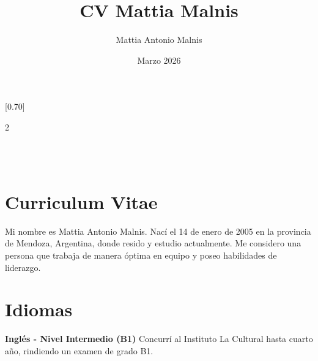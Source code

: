 \documentclass[lighthipster]{simplehipstercv}
\title{CV Mattia Malnis}
\author{Mattia Antonio Malnis}
\date{Marzo 2026}
\begin{document}
\thispagestyle{empty}


\subsection*{}
\vspace{4em} 

\setlength{\columnsep}{1cm}
[0.70]
\begin{paracol}{2}

\footnotesize
{\setasidefontcolour
\begin{center}
\end{center}

\bigskip\bigskip

\begin{flushleft}
     \\[0.8em]
     \\[0.8em]
    
\end{flushleft}
}

\switchcolumn

\vspace{2em} 
\small
\section*{Curriculum Vitae}
\justifying
{Mi nombre es Mattia Antonio Malnis. Nací el 14 de enero de 2005 en la provincia de Mendoza, Argentina, donde resido y estudio actualmente. Me considero una persona que trabaja de manera óptima en equipo y poseo habilidades de liderazgo.}

\vspace{2.5em}

\section*{Idiomas}
\vspace{0.5em}
\textbf{Inglés - Nivel Intermedio (B1)} \newline
Concurrí al Instituto La Cultural hasta cuarto año, rindiendo un examen de grado B1.


\end{paracol}
\end{document}
